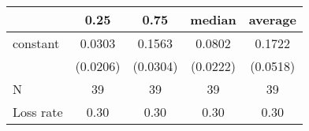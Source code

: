 \begin{tabular}{lcccc}
\hline
          &   0.25   &   0.75   &  median  & average   \\
\midrule
\midrule
constant  & 0.0303   & 0.1563   & 0.0802   & 0.1722    \\
          & (0.0206) & (0.0304) & (0.0222) & (0.0518)  \\
N         & 39       & 39       & 39       & 39        \\
Loss rate & 0.30     & 0.30     & 0.30     & 0.30      \\
\hline
\end{tabular}